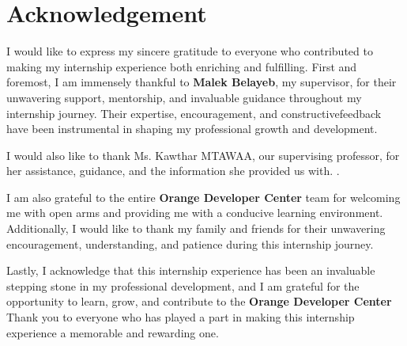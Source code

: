\chapter*{Acknowledgement}

I would like to express my sincere gratitude to everyone who contributed
to making my internship experience both enriching and fulfilling.
First and foremost, I am immensely thankful to \textbf{Malek Belayeb},
my supervisor, for their unwavering support, mentorship, and invaluable
guidance throughout my internship journey. Their expertise, encouragement,
and constructivefeedback have been instrumental in shaping my professional growth
and development.\bigskip

I would also like to thank Ms. Kawthar MTAWAA,
 our supervising professor, 
 for her assistance, guidance, and the information she provided us with. .\bigskip

I am also grateful to the entire \textbf{Orange Developer Center} team for welcoming me with open arms
and providing me with a conducive learning environment.
Additionally, I would like to thank my family and friends for their unwavering encouragement,
understanding, and patience during this internship journey.\bigskip

Lastly, I acknowledge that this internship experience has been an invaluable stepping stone in
my professional development, and I am grateful for the opportunity to learn, grow,
and contribute to the \textbf{Orange Developer Center} Thank you to everyone
who has played a part in making this internship experience a memorable and rewarding one.
